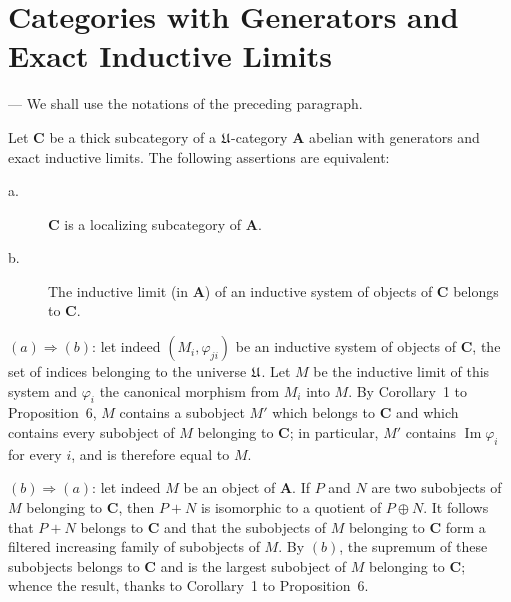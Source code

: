 %
%

\section{Categories with Generators and Exact Inductive Limits}

--- We shall use the notations of the preceding paragraph.

\begin{proposition}
Let $\mathbf{C}$ be a thick subcategory of a $\mathfrak{U}$-category
$\mathbf{A}$ abelian with generators and exact inductive limits. The
following assertions are equivalent:
\begin{description}
\item[\normalfont a.] $\mathbf{C}$ is a localizing subcategory of
      $\mathbf{A}$.
\item[\normalfont b.] The inductive limit (in $\mathbf{A}$) of an
      inductive system of objects of $\mathbf{C}$ belongs to
      $\mathbf{C}$.
\end{description}
\end{proposition}

$(a)\Rightarrow(b)$: let indeed $(M_i,\varphi_{ji})$ be an inductive
system of objects of $\mathbf{C}$, the set of indices belonging to the
universe $\mathfrak{U}$. Let $M$ be the inductive limit of this system and
$\varphi_i$ the canonical morphism from $M_i$ into $M$. By
Corollary~1 to Proposition~6, $M$ contains a subobject $M'$ which
belongs to $\mathbf{C}$ and which contains every subobject of $M$
belonging to $\mathbf{C}$; in particular, $M'$ contains
$\operatorname{Im}\varphi_i$ for every $i$, and is therefore equal to
$M$.

$(b)\Rightarrow(a)$: let indeed $M$ be an object of $\mathbf{A}$. If
$P$ and $N$ are two subobjects of $M$ belonging to $\mathbf{C}$, then
$P+N$ is isomorphic to a quotient of $P\oplus N$. It follows that
$P+N$ belongs to $\mathbf{C}$ and that the subobjects of $M$
belonging to $\mathbf{C}$ form a filtered increasing family of
subobjects of $M$. By $(b)$, the supremum of these subobjects belongs
to $\mathbf{C}$ and is the largest subobject of $M$ belonging to
$\mathbf{C}$; whence the result, thanks to Corollary~1 to
Proposition~6.

